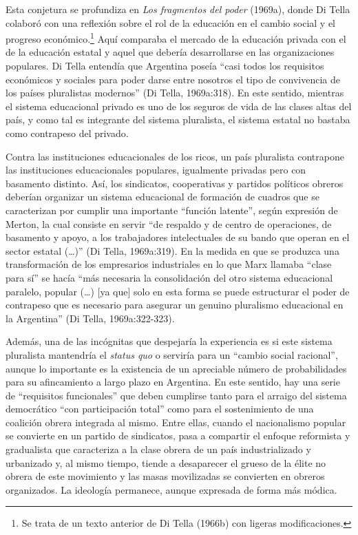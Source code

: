 Esta conjetura se profundiza en \emph{Los fragmentos del poder} (1969a), donde Di Tella colaboró con una reflexión sobre el rol de la educación en el cambio social y el progreso económico.\footnote{Se trata de un texto anterior de Di Tella (1966b) con ligeras modificaciones.} Aquí comparaba el mercado de la educación privada con el de la educación estatal y aquel que debería desarrollarse en las organizaciones populares. Di Tella entendía que Argentina poseía ``casi todos los requisitos económicos y sociales para poder darse entre nosotros el tipo de convivencia de los países pluralistas modernos'' (Di Tella, 1969a:318). En este sentido, mientras el sistema educacional privado es uno de los seguros de vida de las clases altas del país, y como tal es integrante del sistema pluralista, el sistema estatal no bastaba como contrapeso del privado.

Contra las instituciones educacionales de los ricos, un país pluralista contrapone las instituciones educacionales populares, igualmente privadas pero con basamento distinto. Así, los sindicatos, cooperativas y partidos políticos obreros deberían organizar un sistema educacional de formación de cuadros que se caracterizan por cumplir una importante ``función latente'', según expresión de Merton, la cual consiste en servir ``de respaldo y de centro de operaciones, de basamento y apoyo, a los trabajadores intelectuales de su bando que operan en el sector estatal (\dots)'' (Di Tella, 1969a:319). En la medida en que se produzca una transformación de los empresarios industriales en lo que Marx llamaba ``clase para sí'' se hacía ``más necesaria la consolidación del otro sistema educacional paralelo, popular (\dots) [ya que] solo en esta forma se puede estructurar el poder de contrapeso que es necesario para asegurar un genuino pluralismo educacional en la Argentina'' (Di Tella, 1969a:322-323).

Además, una de las incógnitas que despejaría la experiencia es si este sistema pluralista mantendría el \emph{status quo} o serviría para un ``cambio social racional'', aunque lo importante es la existencia de un apreciable número de probabilidades para su afincamiento a largo plazo en Argentina. En este sentido, hay una serie de ``requisitos funcionales'' que deben cumplirse tanto para el arraigo del sistema democrático ``con participación total'' como para el sostenimiento de una coalición obrera integrada al mismo. Entre ellas, cuando el nacionalismo popular se convierte en un partido de sindicatos, pasa a compartir el enfoque reformista y gradualista que caracteriza a la clase obrera de un país industrializado y urbanizado y, al mismo tiempo, tiende a desaparecer el grueso de la élite no obrera de este movimiento y las masas movilizadas se convierten en obreros organizados. La ideología permanece, aunque expresada de forma más módica.

